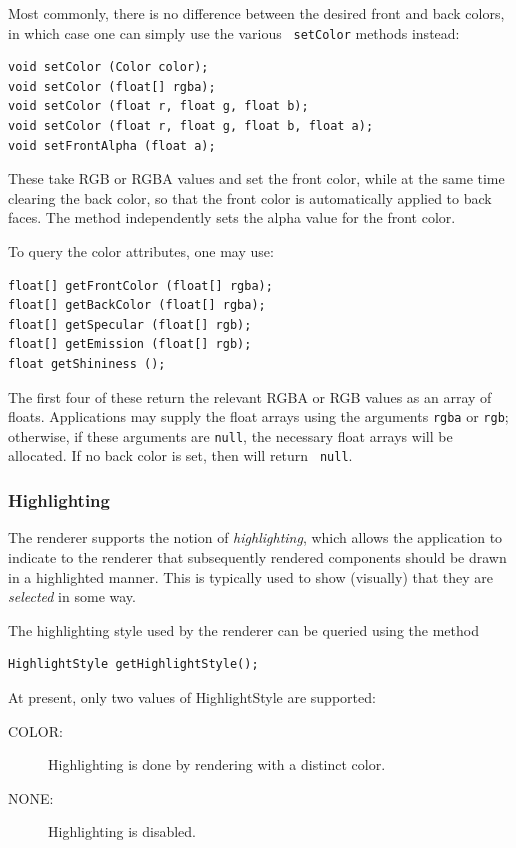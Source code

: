 Most commonly, there is no difference between the desired front and
back colors, in which case one can simply use the various {\tt
setColor} methods instead:
%
\begin{lstlisting}[]
void setColor (Color color);
void setColor (float[] rgba);
void setColor (float r, float g, float b);
void setColor (float r, float g, float b, float a);
void setFrontAlpha (float a);
\end{lstlisting}
%
These take RGB or RGBA values and set the front color, while at the
same time clearing the back color, so that the front color is
automatically applied to back faces. The method
 independently
sets the alpha value for the front color.

To query the color attributes, one may use:
%
\begin{lstlisting}[]
float[] getFrontColor (float[] rgba);
float[] getBackColor (float[] rgba);
float[] getSpecular (float[] rgb);
float[] getEmission (float[] rgb);
float getShininess ();
\end{lstlisting}
%
The first four of these return the relevant RGBA or RGB values as an
array of floats. Applications may supply the float arrays using the
arguments {\tt rgba} or {\tt rgb}; otherwise, if these arguments are
{\tt null}, the necessary float arrays will be allocated. If no back
color is set, then
 will return {\tt
null}.

\subsubsection{Highlighting}
\label{highlighting:sec}

The renderer supports the notion of {\it highlighting}, which allows
the application to indicate to the renderer that subsequently rendered
components should be drawn in a highlighted manner. This is typically
used to show (visually) that they are {\it selected} in some way.

The highlighting style used by the renderer can be queried
using the method
%
\begin{lstlisting}[]
HighlightStyle getHighlightStyle();
\end{lstlisting}
%
At present, only two values of
%
{HighlightStyle}
are supported:

\begin{description}

\item[COLOR:]\mbox{}

Highlighting is done by rendering with a distinct color.

\item[NONE:]\mbox{}

Highlighting is disabled.

\end{description}

